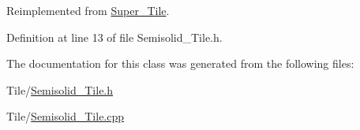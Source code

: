 Reimplemented from \hyperlink{class_super___tile_a7b509383d0d0ad2df0220f7dc4660823}{Super\+\_\+\+Tile}.



Definition at line 13 of file Semisolid\+\_\+\+Tile.\+h.



The documentation for this class was generated from the following files\+:\begin{DoxyCompactItemize}
\item 
Tile/\hyperlink{_semisolid___tile_8h}{Semisolid\+\_\+\+Tile.\+h}\item 
Tile/\hyperlink{_semisolid___tile_8cpp}{Semisolid\+\_\+\+Tile.\+cpp}\end{DoxyCompactItemize}
